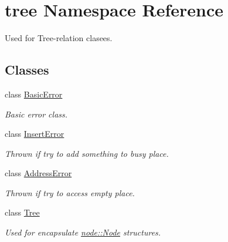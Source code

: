 \hypertarget{namespacetree}{\section{tree Namespace Reference}
\label{namespacetree}
}


Used for Tree-\/relation clasees.  


\subsection*{Classes}
\begin{DoxyCompactItemize}
\item 
class \hyperlink{classtree_1_1BasicError}{Basic\-Error}
\begin{DoxyCompactList}\small\item\em Basic error class. \end{DoxyCompactList}\item 
class \hyperlink{classtree_1_1InsertError}{Insert\-Error}
\begin{DoxyCompactList}\small\item\em Thrown if try to add something to busy place. \end{DoxyCompactList}\item 
class \hyperlink{classtree_1_1AddressError}{Address\-Error}
\begin{DoxyCompactList}\small\item\em Thrown if try to access empty place. \end{DoxyCompactList}\item 
class \hyperlink{classtree_1_1Tree}{Tree}
\begin{DoxyCompactList}\small\item\em Used for encapsulate \hyperlink{classnode_1_1Node}{node\-::\-Node} structures. \end{DoxyCompactList}\end{DoxyCompactItemize}
